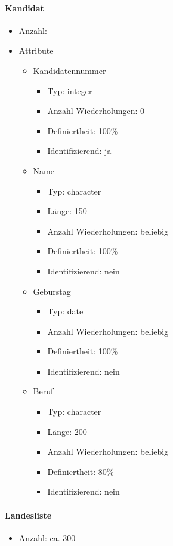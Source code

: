 \documentclass[a4paper]{article}
\begin{document}
\paragraph{Kandidat}
\begin{itemize}
\item Anzahl: 
\item Attribute
	\begin{itemize}
	\item Kandidatennummer
		\begin{itemize}
		\item Typ: integer
		\item Anzahl Wiederholungen: 0
		\item Definiertheit: 100\%
		\item Identifizierend: ja
		\end{itemize}
	\item Name
		\begin{itemize}
		\item Typ: character
		\item Länge: 150
		\item Anzahl Wiederholungen: beliebig
		\item Definiertheit: 100\%
		\item Identifizierend: nein
		\end{itemize}
	\item Geburstag
		\begin{itemize}
		\item Typ: date
		\item Anzahl Wiederholungen: beliebig
		\item Definiertheit: 100\%
		\item Identifizierend: nein
		\end{itemize}
	\item Beruf
		\begin{itemize}
		\item Typ: character
		\item Länge: 200
		\item Anzahl Wiederholungen: beliebig
		\item Definiertheit: 80\%
		\item Identifizierend: nein
		\end{itemize}
	\end{itemize}
\end{itemize}

\paragraph{Landesliste}
\begin{itemize}
\item Anzahl: ca. 300
\end{itemize}
\end{document}
